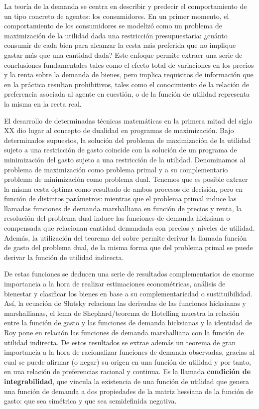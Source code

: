 \documentclass{nuevotema}
\begin{document}
\ideaclave

La teoría de la demanda se centra en describir y predecir el comportamiento de un tipo concreto de agentes: los consumidores. En un primer momento, el comportamiento de los consumidores se modelizó como un problema de maximización de la utilidad dada una restricción presupuestaria: ¿cuánto consumir de cada bien para alcanzar la cesta más preferida que no implique gastar más que una cantidad dada? Este enfoque permite extraer una serie de conclusiones fundamentales tales como el efecto total de variaciones en los precios y la renta sobre la demanda de bienes, pero implica requisitos de información que en la práctica resultan prohibitivos, tales como el conocimiento de la relación de preferencia asociada al agente en cuestión, o de la función de utilidad representa la misma en la recta real.

El desarrollo de determinadas técnicas matemáticas en la primera mitad del siglo XX dio lugar al concepto de dualidad en programas de maximización. Bajo determinados supuestos, la solución del problema de maximización de la utilidad sujeto a una restricción de gasto coincide con la solución de un programa de minimización del gasto sujeto a una restricción de la utilidad. Denominamos al problema de maximización como problema primal y a su complementario problema de minimización como problema dual. Tenemos que es posible extraer la misma cesta óptima como resultado de ambos procesos de decisión, pero en función de distintos parámetros: mientras que el problema primal induce las llamadas funciones de demanda marshalliana en función de precios y renta, la resolución del problema dual induce las funciones de demanda hicksiana o compensada que relacionan cantidad demandada con precios y niveles de utilidad. Además, la utilización del teorema del sobre permite derivar la llamada función de gasto del problema dual, de la misma forma que del problema primal se puede derivar la función de utilidad indirecta. 

De estas funciones se deducen una serie de resultados complementarios de enorme importancia a la hora de realizar estimaciones econométricas, análisis de bienestar y clasificar los bienes en base a su complementariedad o sustituibilidad. Así, la ecuación de Slutsky relaciona las derivadas de las funciones hicksianas y marshallianas, el lema de Shephard/teorema de Hotelling muestra la relación entre la función de gasto y las funciones de demanda hicksianas y la identidad de Roy pone en relación las funciones de demanda marshalliana con la función de utilidad indirecta. De estos resultados se extrae además un teorema de gran importancia a la hora de racionalizar funciones de demanda observadas, gracias al cual se puede afirmar (o negar) su origen en una función de utilidad y por tanto, en una relación de preferencias racional y continua. Es la llamada \textbf{condición de integrabilidad}, que vincula la existencia de una función de utilidad que genera una función de demanda a dos propiedades de la matriz hessiana de la función de gasto: que sea simétrica y que sea semidefinida negativa.
\end{document}
